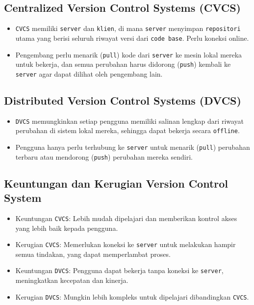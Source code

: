 \documentclass{article}
\begin{document}
\subsection{Centralized Version Control Systems (CVCS)}
\begin{itemize}
    \item \texttt{CVCS} memiliki \texttt{server} dan \texttt{klien}, di mana \texttt{server} menyimpan \texttt{repositori} utama yang berisi seluruh riwayat versi dari \texttt{code base}. Perlu koneksi online.
    \item Pengembang perlu menarik (\texttt{pull}) kode dari \texttt{server} ke mesin lokal mereka untuk bekerja, dan semua perubahan harus didorong (\texttt{push}) kembali ke \texttt{server} agar dapat dilihat oleh pengembang lain.
\end{itemize}

\subsection{Distributed Version Control Systems (DVCS)}
\begin{itemize}
    \item \texttt{DVCS} memungkinkan setiap pengguna memiliki salinan lengkap dari riwayat perubahan di sistem lokal mereka, sehingga dapat bekerja secara \texttt{offline}.
    \item Pengguna hanya perlu terhubung ke \texttt{server} untuk menarik (\texttt{pull}) perubahan terbaru atau mendorong (\texttt{push}) perubahan mereka sendiri.
\end{itemize}

\subsection{Keuntungan dan Kerugian Version Control System}
\begin{itemize}
    \item Keuntungan \texttt{CVCS}: Lebih mudah dipelajari dan memberikan kontrol akses yang lebih baik kepada pengguna.
    \item Kerugian \texttt{CVCS}: Memerlukan koneksi ke \texttt{server} untuk melakukan hampir semua tindakan, yang dapat memperlambat proses.
    \item Keuntungan \texttt{DVCS}: Pengguna dapat bekerja tanpa koneksi ke \texttt{server}, meningkatkan kecepatan dan kinerja.
    \item Kerugian \texttt{DVCS}: Mungkin lebih kompleks untuk dipelajari dibandingkan \texttt{CVCS}.
\end{itemize}
\end{document}
